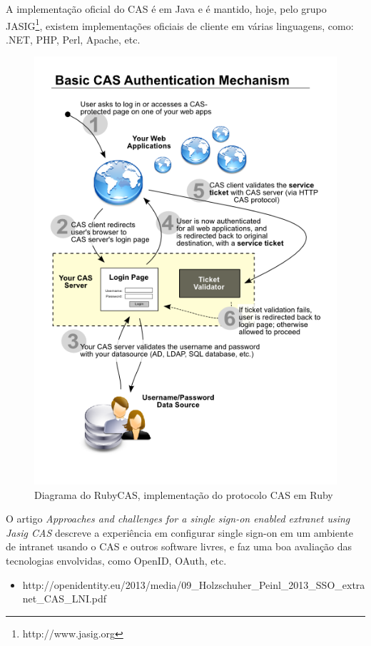 \documentclass[11pt]{article}
\begin{document}
A implementação oficial do CAS é em Java e é mantido, hoje, pelo grupo
JASIG\footnote{http://www.jasig.org}, existem implementações oficiais de
cliente em várias linguagens, como: .NET, PHP, Perl, Apache, etc.

\begin{figure}[h]
\center
\includegraphics[scale=0.4]{sso-rubycas.png}
\caption{Diagrama do RubyCAS, implementação do protocolo CAS em Ruby}
\label{fig:sso-rubycas}
\end{figure}

O artigo {\it Approaches and challenges for a single sign-on enabled extranet
using Jasig CAS} descreve a experiência em configurar single sign-on em um
ambiente de intranet usando o CAS e outros software livres, e faz uma boa
avaliação das tecnologias envolvidas, como OpenID, OAuth, etc.

\begin{itemize}
  \item{http://openidentity.eu/2013/media/09\_Holzschuher\_Peinl\_2013\_SSO\_extranet\_CAS\_LNI.pdf}
\end{itemize}
\end{document}
